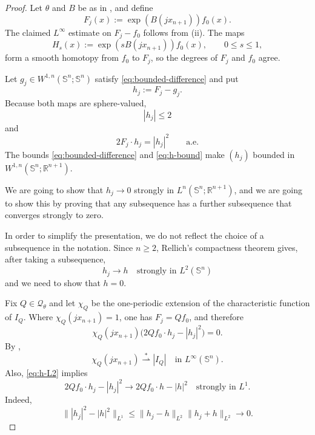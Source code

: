 \documentclass[11pt,reqno]{amsart}
\numberwithin{equation}{section}
\newcommand{\Sph}{\mathbb S}
\newcommand{\R}{\mathbb R}
\newcommand{\weakstar}{\mathrel{\stackrel{*}{\rightharpoonup}}}
\begin{document}
\begin{proof}
Let $\theta$ and $B$ be as in , and define
\begin{equation}\label{eq:Fj-def}
  F_j(x):=\exp(B(jx_{n+1}))f_0(x).
\end{equation}
The claimed $L^\infty$ estimate on $F_j-f_0$ follows from (ii).  The maps
\[
  H_s(x):=\exp(sB(jx_{n+1}))f_0(x),
  \qquad0\le s\le1,
\]
form a smooth homotopy from $f_0$ to $F_j$, so the degrees of $F_j$ and $f_0$ agree.

Let $g_j\in W^{1,n}(\Sph^n;\Sph^n)$ satisfy \eqref{eq:bounded-difference} and put
\[
  h_j:=F_j-g_j.
\]
Because both maps are sphere-valued,
\begin{equation}\label{eq:h-bound}
  |h_j|\le2
\end{equation}
and
\begin{equation}\label{eq:sphere-identity}
  2F_j\cdot h_j=|h_j|^2
  \qquad\text{a.e.}
\end{equation}
The bounds \eqref{eq:bounded-difference} and \eqref{eq:h-bound} make $(h_j)$ bounded in $W^{1,n}(\Sph^n;\R^{n+1})$. 

We are going to show that $h_j\to 0$ strongly in $L^n(\Sph^n;\R^{n+1})$, and we are going to show this by proving that any subsequence has a further subsequence that converges strongly to zero. 

In order to simplify the presentation, we do not reflect the choice of a subsequence in the notation. Since $n\ge2$, Rellich's compactness theorem gives, after taking a subsequence,
\begin{equation}\label{eq:h-L2}
  h_j\to h\quad\text{strongly in }L^2(\Sph^n)
\end{equation}
and we need to show that $h=0$.

Fix $Q\in\mathcal Q_\theta$ and let $\chi_Q$ be the one-periodic extension of the characteristic function of $I_Q$.  Where $\chi_Q(jx_{n+1})=1$, one has $F_j=Qf_0$, and therefore
\begin{equation}\label{eq:plateau-identity}
  \chi_Q(jx_{n+1})
  \bigl(2Qf_0\cdot h_j-|h_j|^2\bigr)=0.
\end{equation}
By ,
\begin{equation}\label{eq:chi-average}
  \chi_Q(jx_{n+1})\weakstar |I_Q|
  \quad\text{in }L^\infty(\Sph^n).
\end{equation}
Also, \eqref{eq:h-L2} implies
\begin{equation}\label{eq:nonlinear-L1}
  2Qf_0\cdot h_j-|h_j|^2
  \to2Qf_0\cdot h-|h|^2
  \quad\text{strongly in }L^1.
\end{equation}
Indeed,
\[
  \||h_j|^2-|h|^2\|_{L^1}
  \le\|h_j-h\|_{L^2}\|h_j+h\|_{L^2}\to0.
\]


\end{proof}
\end{document}
